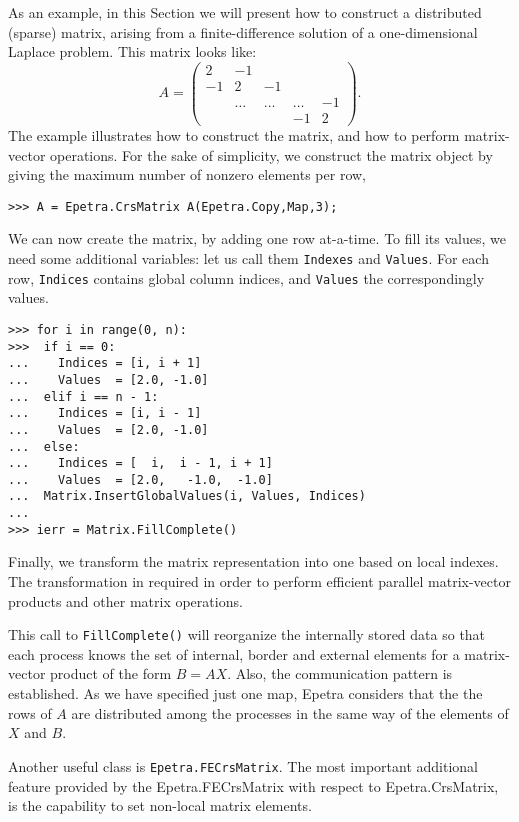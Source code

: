\documentclass[10pt,relax]{SANDreport}
\begin{document}
As an example, in this Section we will present how to construct a
distributed (sparse) matrix, arising from a finite-difference solution
of a one-dimensional Laplace problem. This matrix looks like:
\begin{equation*}
A = \begin{pmatrix}
 2 & -1 &     &   &    \\
-1 &  2     & -1     &        &    \\
   & \ldots & \ldots & \ldots & -1 \\
   &        &        & -1     & 2
\end{pmatrix}.
\end{equation*}
The example illustrates how to construct the matrix,
and how to perform matrix-vector operations. For the sake of simplicity, we
construct the matrix object by giving the maximum number of nonzero elements
per row,
\begin{verbatim}
>>> A = Epetra.CrsMatrix A(Epetra.Copy,Map,3);
\end{verbatim}
We can now create the matrix, by adding one row at-a-time.
To fill its values, we
need some additional variables: let us call them \verb!Indexes! and
\verb!Values!. For each row, \verb!Indices! contains global column
indices, and \verb!Values! the correspondingly values.
\begin{verbatim}
>>> for i in range(0, n):
>>>  if i == 0:
...    Indices = [i, i + 1]
...    Values  = [2.0, -1.0]
...  elif i == n - 1:
...    Indices = [i, i - 1]
...    Values  = [2.0, -1.0]
...  else:
...    Indices = [  i,  i - 1, i + 1]
...    Values  = [2.0,   -1.0,  -1.0]
...  Matrix.InsertGlobalValues(i, Values, Indices)
...
>>> ierr = Matrix.FillComplete()
\end{verbatim}
Finally, we transform the matrix representation into one based on local
indexes. The transformation in required in order to perform efficient parallel
matrix-vector products and other matrix operations.

This call to \verb!FillComplete()! will reorganize the internally stored
data so that each process knows the set of internal, border and external
elements for a matrix-vector product of the form $B = AX$. Also, the
communication pattern is established. As we have specified just one map,
Epetra considers that the the rows of $A$ are distributed among the
processes in the same way of the elements of $X$ and $B$.

Another useful class is {\tt Epetra.FECrsMatrix}.
The most important additional feature provided by the
Epetra.FECrsMatrix with respect to Epetra.CrsMatrix, is the capability
to set non-local matrix elements. 
\end{document}
